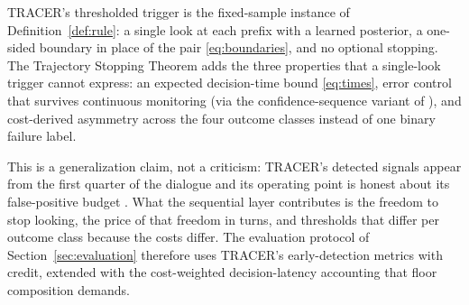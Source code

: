 \begin{corollary}
\label{cor:tracer}
TRACER's thresholded trigger is the fixed-sample instance of Definition~\ref{def:rule}: a single look at each prefix with a learned posterior, a one-sided boundary in place of the pair \eqref{eq:boundaries}, and no optional stopping.
The Trajectory Stopping Theorem adds the three properties that a single-look trigger cannot express: an expected decision-time bound \eqref{eq:times}, error control that survives continuous monitoring (via the confidence-sequence variant of \citealp{howard2021time}), and cost-derived asymmetry across the four outcome classes instead of one binary failure label.
\end{corollary}

This is a generalization claim, not a criticism: TRACER's detected signals appear from the first quarter of the dialogue and its operating point is honest about its false-positive budget \citep{nourbakhsh2026tracer}.
What the sequential layer contributes is the freedom to stop looking, the price of that freedom in turns, and thresholds that differ per outcome class because the costs differ.
The evaluation protocol of Section~\ref{sec:evaluation} therefore uses TRACER's early-detection metrics with credit, extended with the cost-weighted decision-latency accounting that floor composition demands.
